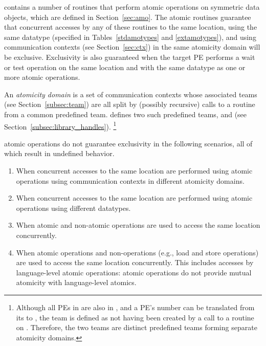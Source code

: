 \openshmem contains a number of routines that perform atomic operations on
symmetric data objects, which are defined in Section~\ref{sec:amo}.
The atomic routines
guarantee that concurrent accesses by any of these routines to the same
location, using the same datatype (specified in Tables~\ref{stdamotypes} and
\ref{extamotypes}), and using communication contexts (see Section~\ref{sec:ctx})
in the same atomicity domain will be exclusive.
Exclusivity is also guaranteed when the target \ac{PE} performs a wait or test
operation on the same location and with the same datatype as one or more atomic
operations.

An \openshmem \emph{atomicity domain} is a set of communication
contexts whose associated teams (see Section~\ref{subsec:team}) are
all split by (possibly recursive) calls to a
 routine from a common predefined team.
\openshmem defines two such predefined teams, 
and  (see Section~\ref{subsec:library_handles}).%
\footnote{
  Although all \acp{PE} in  are also
  in , and a \ac{PE}'s number can be
  translated from its  to
  , the
   team is defined as not having
  been created by a call to a  routine on
  .
  Therefore, the two teams are distinct predefined teams forming
  separate atomicity domains.
}

\openshmem atomic operations do not guarantee exclusivity in the following
scenarios, all of which result in undefined behavior.
\begin{enumerate}
    \item \label{amo-scenario/1}
        When concurrent accesses to the same location are performed using
        \openshmem atomic operations using communication contexts in
        different atomicity domains.
    \item \label{amo-scenario/2}
        When concurrent accesses to the same location are performed using
        \openshmem atomic operations using different datatypes.
    \item \label{amo-scenario/3}
        When atomic and non-atomic \openshmem operations are used to access
        the same location concurrently.
    \item \label{amo-scenario/4}
        When \openshmem atomic operations and non-\openshmem operations (e.g.,
        load and store operations) are used to access the same location
        concurrently. This includes accesses by language-level atomic
        operations: \openshmem atomic operations do not provide mutual
        atomicity with language-level atomics.
\end{enumerate}

